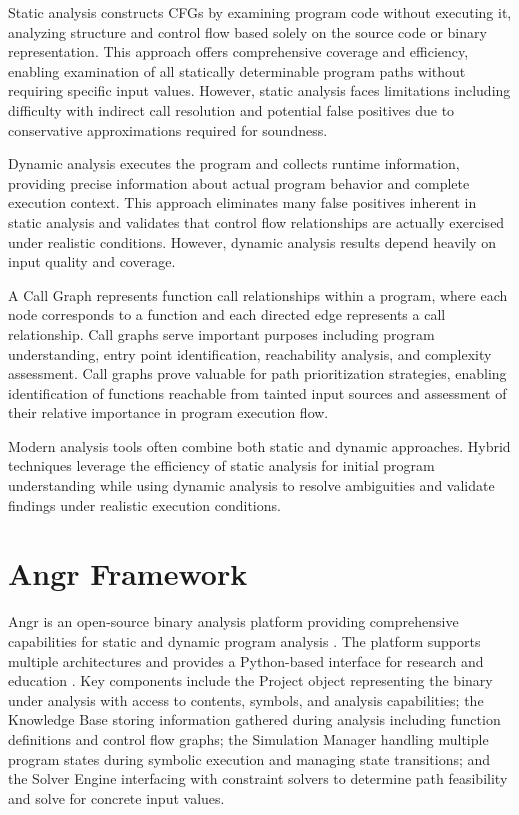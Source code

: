 Static analysis constructs CFGs by examining program code without executing it, analyzing structure and control flow based solely on the source code or binary representation. This approach offers comprehensive coverage and efficiency, enabling examination of all statically determinable program paths without requiring specific input values. However, static analysis faces limitations including difficulty with indirect call resolution and potential false positives due to conservative approximations required for soundness.

Dynamic analysis executes the program and collects runtime information, providing precise information about actual program behavior and complete execution context. This approach eliminates many false positives inherent in static analysis and validates that control flow relationships are actually exercised under realistic conditions. However, dynamic analysis results depend heavily on input quality and coverage.

A Call Graph represents function call relationships within a program, where each node corresponds to a function and each directed edge represents a call relationship. Call graphs serve important purposes including program understanding, entry point identification, reachability analysis, and complexity assessment. Call graphs prove valuable for path prioritization strategies, enabling identification of functions reachable from tainted input sources and assessment of their relative importance in program execution flow.

Modern analysis tools often combine both static and dynamic approaches. Hybrid techniques leverage the efficiency of static analysis for initial program understanding while using dynamic analysis to resolve ambiguities and validate findings under realistic execution conditions.

\section{Angr Framework}

Angr is an open-source binary analysis platform providing comprehensive capabilities for static and dynamic program analysis \cite{shoshitaishvili_sok_2016}. The platform supports multiple architectures and provides a Python-based interface for research and education \cite{springer_teaching_2018}. Key components include the Project object representing the binary under analysis with access to contents, symbols, and analysis capabilities; the Knowledge Base storing information gathered during analysis including function definitions and control flow graphs; the Simulation Manager handling multiple program states during symbolic execution and managing state transitions; and the Solver Engine interfacing with constraint solvers to determine path feasibility and solve for concrete input values.

